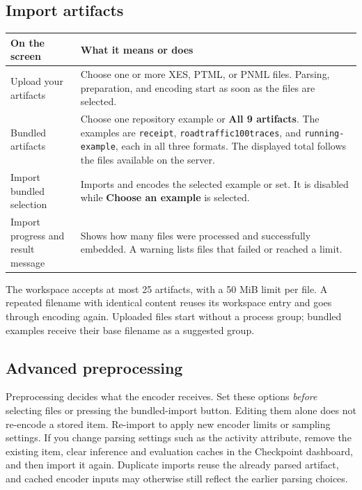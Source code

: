 \documentclass[11pt,a4paper]{article}
\makeatletter
\newcommand{\ui}[1]{\textbf{#1}}
\newcommand{\code}[1]{\nolinkurl{#1}}
\newenvironment{controls}{%
  \small\begin{longtable}{@{}>{\raggedright\arraybackslash}p{.34\linewidth}
    >{\raggedright\arraybackslash}p{.62\linewidth}@{}}
  \toprule\textbf{On the screen} & \textbf{What it means or does}\\\midrule\endhead
  \bottomrule\endfoot
}{\end{longtable}\normalsize}
\makeatother
\begin{document}
\subsection{Import artifacts}
\begin{controls}
Upload your artifacts & Choose one or more XES, PTML, or PNML files. Parsing,
preparation, and encoding start as soon as the files are selected.\\
Bundled artifacts & Choose one repository example or \ui{All 9 artifacts}.
The examples are \code{receipt}, \code{roadtraffic100traces}, and
\code{running-example}, each in all three formats. The displayed total follows
the files available on the server.\\
Import bundled selection & Imports and encodes the selected example or set.
It is disabled while \ui{Choose an example} is selected.\\
Import progress and result message & Shows how many files were processed and
successfully embedded. A warning lists files that failed or reached a limit.\\
\end{controls}

The workspace accepts at most 25 artifacts, with a 50 MiB limit per file.
A repeated filename with identical content reuses its workspace entry and
goes through encoding again. Uploaded files start without a process group;
bundled examples receive their base filename as a suggested group.

\subsection{Advanced preprocessing}
\label{sec:preprocessing}
Preprocessing decides what the encoder receives. Set these options
\emph{before} selecting files or pressing the bundled-import button.
Editing them alone does not re-encode a stored item. Re-import to apply new
encoder limits or sampling settings. If you change parsing settings such as
the activity attribute, remove the existing item, clear inference and evaluation
caches in the Checkpoint dashboard, and then import it again. Duplicate imports
reuse the already parsed artifact, and cached encoder inputs may otherwise
still reflect the earlier parsing choices.
\end{document}
